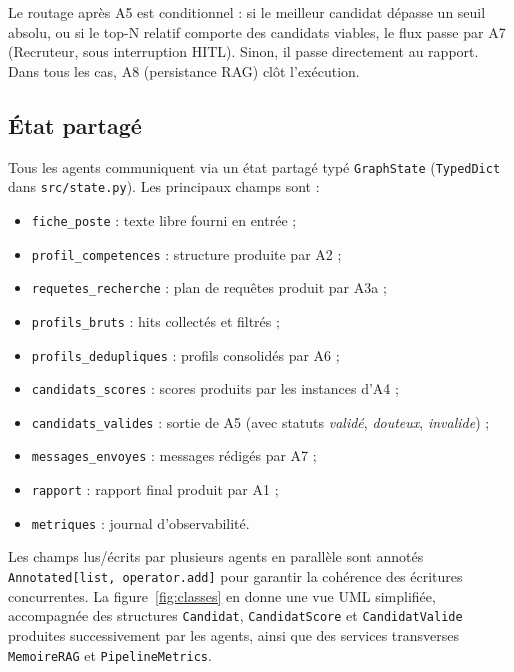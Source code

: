 

Le routage après A5 est conditionnel : si le meilleur candidat dépasse un seuil absolu, ou si le top-N relatif comporte des candidats viables, le flux passe par A7 (Recruteur, sous interruption HITL). Sinon, il passe directement au rapport. Dans tous les cas, A8 (persistance RAG) clôt l'exécution.

\subsection{État partagé}

Tous les agents communiquent via un état partagé typé \texttt{GraphState} (\texttt{TypedDict} dans \texttt{src/state.py}). Les principaux champs sont :

\begin{itemize}[leftmargin=1cm]
\item \texttt{fiche\_poste} : texte libre fourni en entrée ;
\item \texttt{profil\_competences} : structure produite par A2 ;
\item \texttt{requetes\_recherche} : plan de requêtes produit par A3a ;
\item \texttt{profils\_bruts} : hits collectés et filtrés ;
\item \texttt{profils\_dedupliques} : profils consolidés par A6 ;
\item \texttt{candidats\_scores} : scores produits par les instances d'A4 ;
\item \texttt{candidats\_valides} : sortie de A5 (avec statuts \emph{validé}, \emph{douteux}, \emph{invalide}) ;
\item \texttt{messages\_envoyes} : messages rédigés par A7 ;
\item \texttt{rapport} : rapport final produit par A1 ;
\item \texttt{metriques} : journal d'observabilité.
\end{itemize}

Les champs lus/écrits par plusieurs agents en parallèle sont annotés \texttt{Annotated[list, operator.add]} pour garantir la cohérence des écritures concurrentes. La figure~\ref{fig:classes} en donne une vue UML simplifiée, accompagnée des structures \texttt{Candidat}, \texttt{CandidatScore} et \texttt{CandidatValide} produites successivement par les agents, ainsi que des services transverses \texttt{MemoireRAG} et \texttt{PipelineMetrics}.



